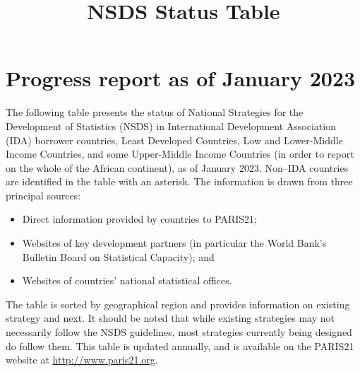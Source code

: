 \documentclass[
]{article}
\title{NSDS Status Table}
\author{}
\date{\vspace{-2.5em}}
\providecommand{\tightlist}{%
  \setlength{\itemsep}{0pt}\setlength{\parskip}{0pt}}
\begin{document}
\maketitle

{
\setcounter{tocdepth}{2}
\tableofcontents
}
\hypertarget{progress-report-as-of-january-2023}{%
\section*{Progress report as of January 2023}\label{progress-report-as-of-january-2023}}

The following table presents the status of National Strategies for the Development of Statistics (NSDS) in International Development Association (IDA) borrower countries, Least Developed Countries, Low and Lower-Middle Income Countries, and some Upper-Middle Income Countries (in order to report on the whole of the African continent), as of January 2023. Non--IDA countries are identified in the table with an asterisk. The information is drawn from three principal sources:

\begin{itemize}
\tightlist
\item
  Direct information provided by countries to PARIS21;
\item
  Websites of key development partners (in particular the World Bank's Bulletin Board on Statistical Capacity); and
\item
  Websites of countries' national statistical offices.
\end{itemize}

The table is sorted by geographical region and provides information on existing strategy and next. It should be noted that while existing strategies may not necessarily follow the NSDS guidelines, most strategies currently being designed do follow them. This table is updated annually, and is available on the PARIS21 website at \url{http://www.paris21.org}.
\end{document}
